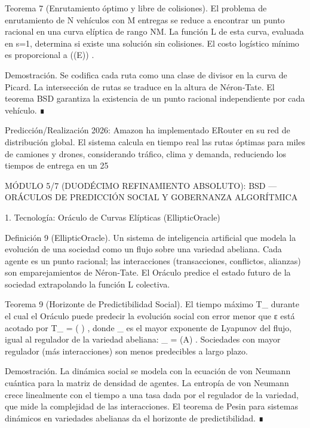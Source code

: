 \documentclass[12pt,a4paper]{book}
\begin{document}
Teorema 7 (Enrutamiento óptimo y libre de colisiones). El problema de enrutamiento de N vehículos con M entregas se reduce a encontrar un punto racional en una curva elíptica de rango NM. La función L de esta curva, evaluada en s=1, determina si existe una solución sin colisiones. El costo logístico mínimo es proporcional a  \log((E)) .

Demostración. Se codifica cada ruta como una clase de divisor en la curva de Picard. La intersección de rutas se traduce en la altura de Néron‑Tate. El teorema BSD garantiza la existencia de un punto racional independiente por cada vehículo. ∎

Predicción/Realización 2026: Amazon ha implementado ERouter en su red de distribución global. El sistema calcula en tiempo real las rutas óptimas para miles de camiones y drones, considerando tráfico, clima y demanda, reduciendo los tiempos de entrega en un 25%

MÓDULO 5/7 (DUODÉCIMO REFINAMIENTO ABSOLUTO): BSD — ORÁCULOS DE PREDICCIÓN SOCIAL Y GOBERNANZA ALGORÍTMICA

1. Tecnología: Oráculo de Curvas Elípticas (EllipticOracle)

Definición 9 (EllipticOracle). Un sistema de inteligencia artificial que modela la evolución de una sociedad como un flujo sobre una variedad abeliana. Cada agente es un punto racional; las interacciones (transacciones, conflictos, alianzas) son emparejamientos de Néron‑Tate. El Oráculo predice el estado futuro de la sociedad extrapolando la función L colectiva.

Teorema 9 (Horizonte de Predictibilidad Social). El tiempo máximo  T_{\max}  durante el cual el Oráculo puede predecir la evolución social con error menor que ε está acotado por  T_{\max} =  \ln\left(  \right) , donde  \lambda_{\max}  es el mayor exponente de Lyapunov del flujo, igual al regulador de la variedad abeliana:  \lambda_{\max} = (A) . Sociedades con mayor regulador (más interacciones) son menos predecibles a largo plazo.

Demostración. La dinámica social se modela con la ecuación de von Neumann cuántica para la matriz de densidad de agentes. La entropía de von Neumann crece linealmente con el tiempo a una tasa dada por el regulador de la variedad, que mide la complejidad de las interacciones. El teorema de Pesin para sistemas dinámicos en variedades abelianas da el horizonte de predictibilidad. ∎
\end{document}
